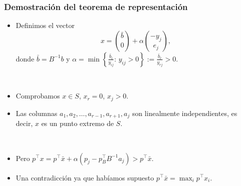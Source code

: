 \documentclass{beamer}
\begin{document}
\begin{frame}
\frametitle{Demostración del teorema de representación}

{\scriptsize

\begin{itemize}

\item Definimos el vector
\[
x = {\bar{b}\choose 0} + \alpha {-y_j\choose e_j},
\]
donde $\bar{b} = B^{-1}b$ y $\alpha =\min\left\{\frac{\bar{b}_i}{y_{ij}}:\, y_{ij}>0 \right\}:= \frac{\bar{b}_r}{y_{rj}}>0$.

\

\item Comprobamos $x\in S$, $x_r=0$, $x_j>0$. 

\item Las columnas $a_1,a_2,\ldots,a_{r-1},a_{r+1},a_j$
son linealmente independientes, es decir, $x$ es un punto extremo de $S$.


\

\item Pero $p^\top x = p^\top \bar{x} + \alpha (p_j-p_B^\top B^{-1}a_j)> p^\top \bar{x}$.

\item Una contradicción ya que habíamos supuesto $p^\top \bar{x} =\max_i p^\top x_i$.
\end{itemize}
}

\end{frame}
\end{document}
